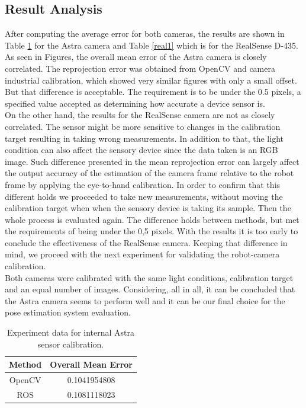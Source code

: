 \subsection{Result Analysis}
After computing the average error for both cameras, the results are shown in Table \ref{astra1} for the Astra camera and Table \ref{real1} which is for the RealSense D-435.\\
 As seen in Figures, the overall mean error of the Astra camera is closely correlated. The reprojection error was obtained from OpenCV and camera \textunderscore industrial calibration, which showed very similar figures with only a small offset. But that difference is acceptable. The requirement is to be under the 0.5 pixels, a specified value accepted as determining how accurate a device sensor is. \\
On the other hand, the results for the RealSense camera are not as closely correlated. The sensor might be more sensitive to changes in the calibration target resulting in taking wrong measurements. In addition to that, the light condition can also affect the sensory device since the data taken is an RGB image. Such difference presented in the mean reprojection error can largely affect the output accuracy of the estimation of the camera frame relative to the robot frame by applying the eye-to-hand calibration. In order to confirm that this different holds we proceeded to take new measurements, without moving the calibration target when when the sensory device is taking its sample. Then the whole process is evaluated again. The difference holds between methods, but met the requirements of being under the 0,5 pixels. With the results it is too early to conclude the effectiveness of the RealSense camera. Keeping that difference in mind, we proceed with the next experiment for validating the robot-camera calibration.  \\
Both cameras were calibrated with the same light conditions, calibration target and an equal number of images. Considering, all in all, it can be concluded that the Astra camera seems to perform well and it can be our final choice for the pose estimation system evaluation. 

\begin{table}[ht]
\renewcommand{\arraystretch}{1.3}
\caption{Experiment data for internal Astra sensor calibration.}
\label{astra1}
\centering
\begin{tabular}{|c||c|}
\hline
Method & Overall Mean Error\\
\hline
OpenCV &  0.1041954808\\
\hline
ROS &  0.1081118023\\
\hline
\hline
\end{tabular}
\end{table}

